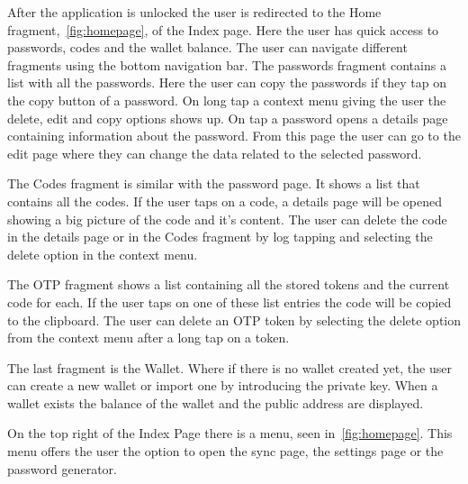 \documentclass[a4paper,12pt]{report}
\begin{document}
After the application is unlocked the user is redirected to the Home
fragment,~\autoref{fig:homepage}, of the Index page. Here the user has quick
access to passwords, codes and the wallet balance. The user can navigate
different fragments using the bottom navigation bar. The passwords fragment
contains a list with all the passwords. Here the user can copy the passwords if
they tap on the copy button of a password. On long tap a context menu giving
the user the delete, edit and copy options shows up. On tap a password opens a
details page containing information about the password. From this page the user
can go to the edit page where they can change the data related to the selected
password.

The Codes fragment is similar with the password page. It shows a list that
contains all the codes. If the user taps on a code, a details page will be
opened showing a big picture of the code and it's content. The user can delete
the code in the details page or in the Codes fragment by log tapping and
selecting the delete option in the context menu.

The OTP fragment shows a list containing all the stored tokens and the current
code for each. If the user taps on one of these list entries the code will be
copied to the clipboard. The user can delete an OTP token by selecting the
delete option from the context menu after a long tap on a token.

The last fragment is the Wallet. Where if there is no wallet created yet, the
user can create a new wallet or import one by introducing the private key. When
a wallet exists the balance of the wallet and the public address are displayed.

On the top right of the Index Page there is a menu, seen
in~\autoref{fig:homepage}. This menu offers the user the option to open the
sync page, the settings page or the password generator.
\end{document}
